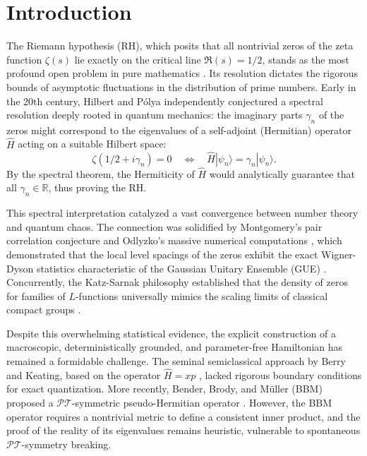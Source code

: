 \documentclass[prl,aps,floatfix,superscriptaddress,10pt]{revtex4-2}
\begin{document}
\section{Introduction}

The Riemann hypothesis (RH), which posits that all nontrivial zeros of the zeta function $\zeta(s)$ lie exactly on the critical line $\Re(s) = 1/2$, stands as the most profound open problem in pure mathematics \cite{Riemann1859}. Its resolution dictates the rigorous bounds of asymptotic fluctuations in the distribution of prime numbers. Early in the 20th century, Hilbert and P\'olya independently conjectured a spectral resolution deeply rooted in quantum mechanics: the imaginary parts $\gamma_n$ of the zeros might correspond to the eigenvalues of a self-adjoint (Hermitian) operator $\hat{H}$ acting on a suitable Hilbert space:
\begin{equation}
\zeta(1/2 + i\gamma_n) = 0 \quad \Longleftrightarrow \quad \hat{H}|\psi_n\rangle = \gamma_n |\psi_n\rangle.
\end{equation}
By the spectral theorem, the Hermiticity of $\hat{H}$ would analytically guarantee that all $\gamma_n \in \mathbb{R}$, thus proving the RH.

This spectral interpretation catalyzed a vast convergence between number theory and quantum chaos. The connection was solidified by Montgomery's pair correlation conjecture \cite{Montgomery1973} and Odlyzko's massive numerical computations \cite{Odlyzko2001}, which demonstrated that the local level spacings of the zeros exhibit the exact Wigner-Dyson statistics characteristic of the Gaussian Unitary Ensemble (GUE) \cite{Bohigas1984}. Concurrently, the Katz-Sarnak philosophy established that the density of zeros for families of $L$-functions universally mimics the scaling limits of classical compact groups \cite{KatzSarnak1999}.

Despite this overwhelming statistical evidence, the explicit construction of a macroscopic, deterministically grounded, and parameter-free Hamiltonian has remained a formidable challenge. The seminal semiclassical approach by Berry and Keating, based on the operator $\hat{H} = xp$ \cite{BerryKeating1999}, lacked rigorous boundary conditions for exact quantization. More recently, Bender, Brody, and M\"uller (BBM) proposed a $\mathcal{PT}$-symmetric pseudo-Hermitian operator \cite{Bender2017}. However, the BBM operator requires a nontrivial metric to define a consistent inner product, and the proof of the reality of its eigenvalues remains heuristic, vulnerable to spontaneous $\mathcal{PT}$-symmetry breaking.
\end{document}
